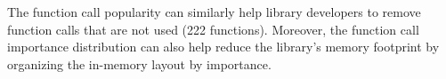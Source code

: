 The \libc{} function call popularity can similarly help library developers to remove function calls that
are not used (222 functions). 
Moreover, the function call importance distribution can also help reduce the library's memory footprint by
organizing the in-memory layout by importance.

\begin{comment}
The x86 processor fetches instructions at the order of cacheline size and usually have an prefetch hardware
that learns sequential or step-based access patterns of memory and prefetch those instructions or data before
it is actually needed. The performance of an application can be highly optimized if there are very low number of
cache misses and if the prefetch hardware can always fetch the right data or instruction.
The compilers know about the details of target architecture and can organize the code to optimize the code
for the target architecture. Using the \libc{} function call popularity, the compilers can place the most frequently used code
together causing less cacheline misses. The least popular part of the library will be demand loaded in memory only if it is accessed.
In fact, this approach can help reduce the working memory set of the application without even any need for special case handling.
For instance, 46\% of all the function call constitute the top 90\% of the most popular function calls. 
\end{comment}







